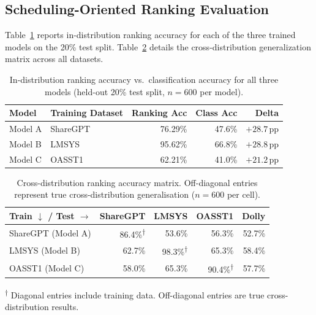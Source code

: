 \documentclass[10pt]{article}
\begin{document}
\subsection{Scheduling-Oriented Ranking Evaluation}
\label{sec:ranking}

Table~\ref{tab:indist} reports in-distribution ranking accuracy for each of the three trained models on the 20\% test split. Table~\ref{tab:crossdist} details the cross-distribution generalization matrix across all datasets.

\begin{table}[H]
  \centering
  \caption{In-distribution ranking accuracy vs.\ classification accuracy for all three models (held-out 20\% test split, $n=600$ per model).}
  \label{tab:indist}
  \small
  \begin{tabular}{llrrr}
    \toprule
    Model   & Training Dataset & Ranking Acc & Class Acc & Delta \\
    \midrule
    Model A & ShareGPT         & 76.29\%     & 47.6\%    & $+28.7$\,pp \\
    Model B & LMSYS            & 95.62\%     & 66.8\%    & $+28.8$\,pp \\
    Model C & OASST1           & 62.21\%     & 41.0\%    & $+21.2$\,pp \\
    \bottomrule
  \end{tabular}
\end{table}

\begin{table}[H]
  \centering
  \caption{Cross-distribution ranking accuracy matrix. Off-diagonal entries represent true cross-distribution generalisation ($n=600$ per cell).}
  \label{tab:crossdist}
  \small
  \begin{tabular}{lrrrr}
    \toprule
    Train $\downarrow$ / Test $\rightarrow$ & ShareGPT & LMSYS & OASST1 & Dolly \\
    \midrule
    ShareGPT (Model A) & 86.4\%\textsuperscript{$\dagger$} & 53.6\% & 56.3\% & 52.7\% \\
    LMSYS (Model B)    & 62.7\% & 98.3\%\textsuperscript{$\dagger$} & 65.3\% & 58.4\% \\
    OASST1 (Model C)   & 58.0\% & 65.3\% & 90.4\%\textsuperscript{$\dagger$} & 57.7\% \\
    \bottomrule
  \end{tabular}
  \par\smallskip
  \raggedright\footnotesize
  \textsuperscript{$\dagger$} Diagonal entries include training data. Off-diagonal entries are true cross-distribution results.
\end{table}
\end{document}
